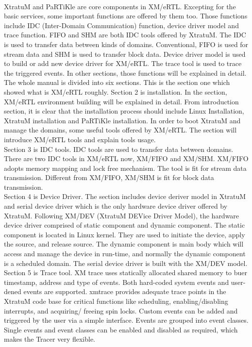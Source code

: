 \\
XtratuM and PaRTiKle are core components in XM/eRTL. Excepting for the basic services, some important functions are offered by them too. Those functions include IDC (Inter-Domain Communication) function, device driver model and trace function. FIFO and SHM are both IDC tools offered by XtratuM. The IDC is used to transfer data between kinds of domains. Conventional, FIFO is used for stream data and SHM is used to transfer block data. Device driver model is used to build or add new device driver for XM/eRTL. The trace tool is used to trace the triggered events. In other sections, those functions will be explained in detail.   
\\
The whole manual is divided into six sections. This is the section one which showed what is XM/eRTL roughly. 
Section 2 is installation. In the section, XM/eRTL environment building will be explained in detail. From introduction section, it is clear that the installation process should include Linux Installation, XtratuM installation and PaRTiKle installation. In order to boot XtratuM and manage the domains, some useful tools offered by XM/eRTL. The section will introduce XM/eRTL tools and explain tools usage.
\\
Section 3 is IDC tools. IDC tools are used to transfer data between domains. There are two IDC tools in XM/eRTL now, XM/FIFO and XM/SHM. XM/FIFO adopts memory mapping and lock free mechanism. The tool is fit for stream data transmission. Different from XM/FIFO, XM/SHM is fit for block data transmission. 
\\
Section 4 is Device Driver. The section includes device deriver model in XtratuM and serial device driver which is the only hardware device driver offered by XtratuM. Following XM/DEV (XtratuM DEVice Driver Model), the hardware device driver comprised of static component and dynamic component. The static component is located in Linux kernel. They are used to initiate the device, apply the source, and release source. The dynamic component is main body which will access and manage the device in run-time, and normally the dynamic component is a scheduled domain. The serial device driver is built with the XM/DEV model. 
\\
Section 5 is Trace tool. XM trace uses statically allocated shared memory to buer timestamp, address and type of events. Both hard-coded system events and user-dened events are supported. xmtrace provides adequate trace points in the XtratuM code base for critical functions like scheduling, enabling/disabling interrupts, and acquiring/ freeing spin locks. Custom events can be added and triggered by the user via a simple interface. Events are grouped into event classes. Single events and event classes can be enabled and disabled as required, which makes the Tracer very flexible.
